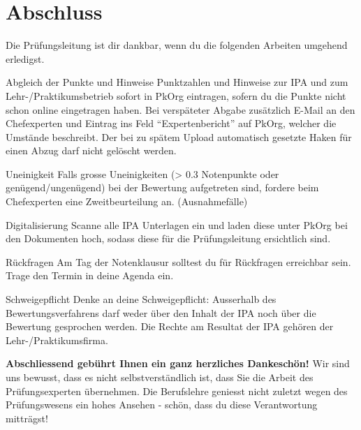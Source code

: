 \chapter{Abschluss}
Die Prüfungsleitung ist dir dankbar, wenn du die folgenden Arbeiten umgehend erledigst.

\begin{taskitemwithoutcomment}{Abgleich der Punkte und Hinweise}
  Punktzahlen und Hinweise zur IPA und zum Lehr-/Praktikumsbetrieb sofort in PkOrg eintragen, sofern du die Punkte nicht schon online eingetragen haben. Bei verspäteter Abgabe zusätzlich E-Mail an den Chefexperten und Eintrag ins Feld \enquote{Expertenbericht} auf PkOrg, welcher die Umstände beschreibt. Der bei zu spätem Upload automatisch gesetzte Haken für einen Abzug darf nicht gelöscht werden.
\end{taskitemwithoutcomment}
\begin{taskitemwithoutcomment}{Uneinigkeit}
  Falls grosse Uneinigkeiten (> 0.3 Notenpunkte oder genügend/ungenügend) bei der Bewertung aufgetreten sind, fordere beim Chefexperten eine Zweitbeurteilung an. (Ausnahmefälle)
\end{taskitemwithoutcomment}
\begin{taskitemwithoutcomment}{Digitalisierung}
  Scanne alle IPA Unterlagen ein und laden diese unter PkOrg bei den Dokumenten hoch, sodass diese für die Prüfungsleitung ersichtlich sind.
\end{taskitemwithoutcomment}
\begin{taskitemwithoutcomment}{Rückfragen}
  Am Tag der Notenklausur solltest du für Rückfragen erreichbar sein. Trage den Termin in deine Agenda ein.
\end{taskitemwithoutcomment}
\begin{taskitemwithoutcomment}{Schweigepflicht}
  Denke an deine Schweigepflicht: Ausserhalb des Bewertungsverfahrens darf weder über den Inhalt der IPA noch über die Bewertung gesprochen werden. Die Rechte am Resultat der IPA gehören der Lehr-/Praktikumsfirma.
\end{taskitemwithoutcomment}

\textbf{Abschliessend gebührt Ihnen ein ganz herzliches Dankeschön!}
Wir sind uns bewusst, dass es nicht selbstverständlich ist, dass Sie die Arbeit des Prüfungsexperten übernehmen. Die Berufslehre geniesst nicht zuletzt wegen des Prüfungswesens ein hohes Ansehen - schön, dass du diese Verantwortung mitträgst!